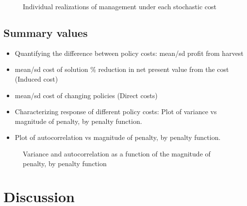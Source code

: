 \documentclass[review, 12pt]{elsarticle}
\begin{document}
  \begin{figure}
    \begin{center}

  \end{center}
 \caption{Individual realizations of management under each stochastic cost}
\end{figure}

\subsection{Summary values}

\begin{itemize}
\item  Quantifying the difference between policy costs: mean/sd profit from harvest
\item  mean/sd cost of solution \% reduction in net present value from the  cost (Induced cost)
\item  mean/sd cost of changing policies (Direct costs)
\item  Characterizing response of different policy costs: Plot of variance vs magnitude of penalty, by penalty function.
\item  Plot of autocorrelation vs magnitude of penalty, by penalty function.
\end{itemize}

\begin{figure}
  \begin{center}
    \caption{Variance and autocorrelation as a function of the magnitude of penalty, by penalty function}
  \end{center}
\end{figure}




\section{Discussion}
\end{document}
